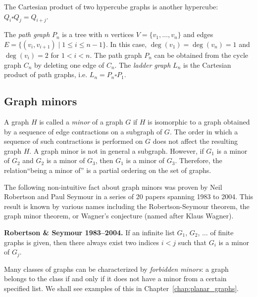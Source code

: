 \begin{example}
The Cartesian product of two hypercube graphs is another
hypercube: $Q_i \square Q_j = Q_{i+j}$.
\end{example}

The \emph{path graph} $P_n$ is a tree with $n$ vertices
$V = \{ v_1,\dots, v_n \}$ and edges
$E = \{ (v_i, v_{i+1}) \;|\; 1 \leq i \leq n-1 \}$. In this case,
$\deg(v_1) = \deg(v_n) = 1$ and $\deg(v_i) = 2$ for $1 < i < n$. The
path graph $P_n$ can be obtained from the cycle graph $C_n$ by
deleting one edge of $C_n$. The \emph{ladder graph} $L_n$ is the
Cartesian product of path graphs, i.e. $L_n = P_n \square P_1$.



\subsection{Graph minors}

A graph $H$ is called a \emph{minor} of a graph $G$ if $H$ is
isomorphic to a graph obtained by a sequence of edge contractions on a
subgraph of $G$.  The order in which a sequence of such contractions is
performed on $G$ does not affect the resulting graph $H$. A graph
minor is not in general a subgraph. However, if $G_1$ is a minor of
$G_2$ and $G_2$ is a minor of $G_3$, then $G_1$ is a minor of
$G_3$. Therefore, the relation``being a minor of'' is a partial
ordering on the set of graphs.

The following non-intuitive fact about graph minors was proven by
Neil Robertson and Paul Seymour in a series of 20 papers spanning 1983
to 2004. This result is known by various names including the
Robertson-Seymour theorem, the graph minor theorem, or Wagner's
conjecture (named after Klaus Wagner).

\begin{theorem}
\textbf{Robertson \& Seymour 1983--2004.}
If an infinite list $G_1$, $G_2$, $\dots$ of finite graphs is given,
then there always exist two indices $i < j$ such that $G_i$ is a minor
of $G_j$.
\end{theorem}

Many classes of graphs can be characterized by
\emph{forbidden minors}: a graph belongs to the class if and only if
it does not have a minor from a certain specified list. We shall see
examples of this in Chapter~\ref{chap:planar_graphs}.



